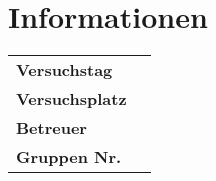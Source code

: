 \restoregeometry

\chapter*{Informationen}
\label{chap:info}

\begin{tabular}{l l}

	{\textbf{Versuchstag}} \hspace{1cm} & \hspace{1cm} {\datum}\\[0,2cm]
	{\textbf{Versuchsplatz}} \hspace{1cm} & \hspace{1cm} {\platz}\\[0,2cm]
	{\textbf{Betreuer}} \hspace{1cm} & \hspace{1cm} {\betreuer}\\[1,2cm]
	{\textbf{Gruppen Nr.}} \hspace{1cm} & \hspace{1cm} {\groupnr}\\[0.2cm]

\end{tabular}